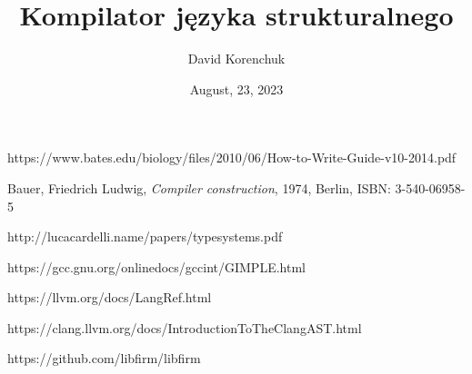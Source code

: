 \documentclass[leqno, 12pt]{article}
\title{Kompilator języka strukturalnego}
\author{David Korenchuk}
\date{August, 23, 2023}
\begin{document}
    \pagestyle{fancy}
    \lhead{\leftmark}
    \rhead{\thetitle}

    \setlength{\parindent}{0pt}

    \maketitle

	
	
	\newpage
	
	\newpage
	
	
	
	
	
	
	
	
	\newpage
	
	\newpage

	\begin{thebibliography}{9}
			https://www.bates.edu/biology/files/2010/06/How-to-Write-Guide-v10-2014.pdf

			Bauer, Friedrich Ludwig,
			\emph{Compiler construction},
			1974, Berlin,
			ISBN: 3-540-06958-5

			http://lucacardelli.name/papers/typesystems.pdf

			https://gcc.gnu.org/onlinedocs/gccint/GIMPLE.html

			https://llvm.org/docs/LangRef.html

			https://clang.llvm.org/docs/IntroductionToTheClangAST.html

			https://github.com/libfirm/libfirm
	\end{thebibliography}

	\newpage

    \tableofcontents
\end{document}
